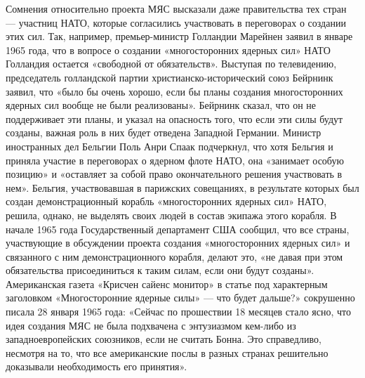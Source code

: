 \documentclass[12pt, a4paper, openany]{book}
\begin{document}
		Сомнения относительно проекта МЯС высказали даже правительства тех стран — участниц НАТО, которые согласились участвовать в переговорах о создании этих сил. Так, например, премьер-министр Голландии Марейнен заявил в январе 1965 года, что в вопросе о создании «многосторонних ядерных сил» НАТО Голландия остается «свободной от обязательств». Выступая по телевидению, председатель голландской партии христианско-исторический союз Бейрнинк заявил, что «было бы очень хорошо, если бы планы создания многосторонних ядерных сил вообще не были реализованы». Бейрнинк сказал, что он не поддерживает эти планы, и указал на опасность того, что если эти силы будут созданы, важная роль в них будет отведена Западной Германии. Министр иностранных дел Бельгии Поль Анри Спаак подчеркнул, что хотя Бельгия и приняла участие в переговорах о ядерном флоте НАТО, она «занимает особую позицию» и «оставляет за собой право окончательного решения участвовать в нем». Бельгия, участвовавшая в парижских совещаниях, в результате которых был создан демонстрационный корабль «многосторонних ядерных сил» НАТО, решила, однако, не выделять своих людей в состав экипажа этого корабля. В начале 1965 года Государственный департамент США сообщил, что все страны, участвующие в обсуждении проекта создания «многосторонних ядерных сил» и связанного с ним демонстрационного корабля, делают это, «не давая при этом обязательства присоединиться к таким силам, если они будут созданы». Американская газета «Крисчен сайенс монитор» в статье под характерным заголовком «Многосторонние ядерные силы» — что будет дальше?» сокрушенно писала 28 января 1965 года: «Сейчас по прошествии 18 месяцев стало ясно, что идея создания МЯС не была подхвачена с энтузиазмом кем-либо из западноевропейских союзников, если не считать Бонна. Это справедливо, несмотря на то, что все американские послы в разных странах решительно доказывали необходимость его принятия».
		
\end{document}
